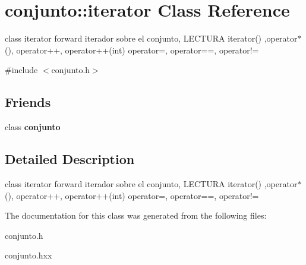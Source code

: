 \hypertarget{classconjunto_1_1iterator}{\section{conjunto\-:\-:iterator Class Reference}
\label{classconjunto_1_1iterator}
}


class iterator forward iterador sobre el conjunto, L\-E\-C\-T\-U\-R\-A iterator() ,operator$\ast$(), operator++, operator++(int) operator=, operator==, operator!=  




{\ttfamily \#include $<$conjunto.\-h$>$}

\subsection*{Friends}
\begin{DoxyCompactItemize}
\item 
\hypertarget{classconjunto_1_1iterator_a42fdcda39c77eabd7380e29fcdbe5dd2}{class {\bfseries conjunto}}\label{classconjunto_1_1iterator_a42fdcda39c77eabd7380e29fcdbe5dd2}

\end{DoxyCompactItemize}


\subsection{Detailed Description}
class iterator forward iterador sobre el conjunto, L\-E\-C\-T\-U\-R\-A iterator() ,operator$\ast$(), operator++, operator++(int) operator=, operator==, operator!= 

The documentation for this class was generated from the following files\-:\begin{DoxyCompactItemize}
\item 
conjunto.\-h\item 
conjunto.\-hxx\end{DoxyCompactItemize}

